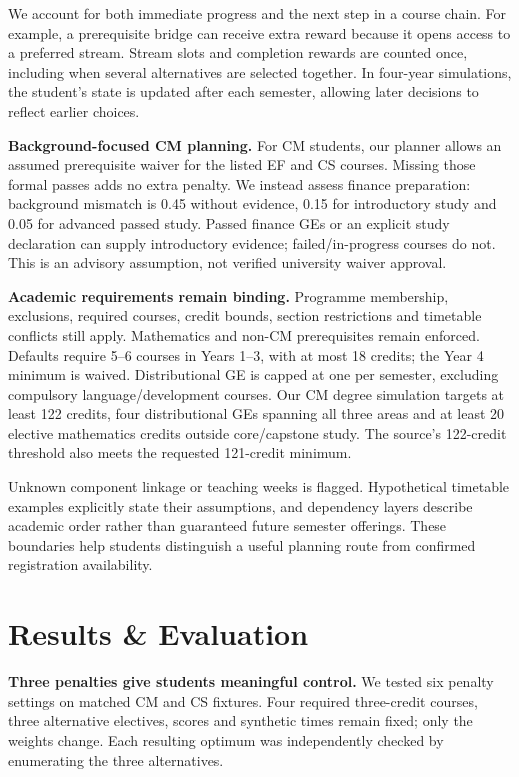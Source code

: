 \documentclass{article}
\begin{document}
We account for both immediate progress and the next step in a course chain. For example, a prerequisite bridge can receive extra reward because it opens access to a preferred stream. Stream slots and completion rewards are counted once, including when several alternatives are selected together. In four-year simulations, the student's state is updated after each semester, allowing later decisions to reflect earlier choices.


\textbf{Background-focused CM planning.} For CM students, our planner allows an assumed prerequisite waiver for the listed EF and CS courses. Missing those formal passes adds no extra penalty. We instead assess finance preparation: background mismatch is 0.45 without evidence, 0.15 for introductory study and 0.05 for advanced passed study. Passed finance GEs or an explicit study declaration can supply introductory evidence; failed/in-progress courses do not. This is an advisory assumption, not verified university waiver approval.

\textbf{Academic requirements remain binding.} Programme membership, exclusions, required courses, credit bounds, section restrictions and timetable conflicts still apply. Mathematics and non-CM prerequisites remain enforced. Defaults require 5--6 courses in Years 1--3, with at most 18 credits; the Year 4 minimum is waived. Distributional GE is capped at one per semester, excluding compulsory language/development courses. Our CM degree simulation targets at least 122 credits, four distributional GEs spanning all three areas and at least 20 elective mathematics credits outside core/capstone study. The source's 122-credit threshold also meets the requested 121-credit minimum.

Unknown component linkage or teaching weeks is flagged. Hypothetical timetable examples explicitly state their assumptions, and dependency layers describe academic order rather than guaranteed future semester offerings. These boundaries help students distinguish a useful planning route from confirmed registration availability.

\newpage
\section{Results \& Evaluation}

\textbf{Three penalties give students meaningful control.} We tested six penalty settings on matched CM and CS fixtures. Four required three-credit courses, three alternative electives, scores and synthetic times remain fixed; only the weights change. Each resulting optimum was independently checked by enumerating the three alternatives.
\end{document}
